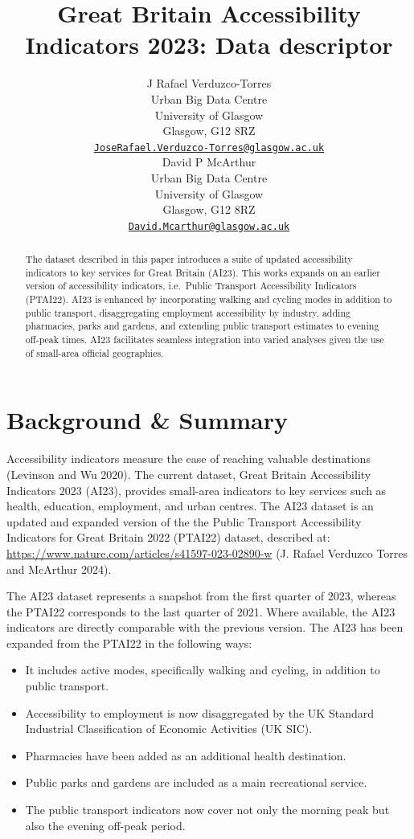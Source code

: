 \documentclass{article}
\title{Great Britain Accessibility Indicators 2023: Data descriptor}
\author{
    J Rafael Verduzco-Torres
   \\
    Urban Big Data Centre \\
    University of Glasgow \\
  Glasgow, G12 8RZ \\
  \texttt{\href{mailto:JoseRafael.Verduzco-Torres@glasgow.ac.uk}{\nolinkurl{JoseRafael.Verduzco-Torres@glasgow.ac.uk}}} \\
   \And
    David P McArthur
   \\
    Urban Big Data Centre \\
    University of Glasgow \\
  Glasgow, G12 8RZ \\
  \texttt{\href{mailto:David.Mcarthur@glasgow.ac.uk}{\nolinkurl{David.Mcarthur@glasgow.ac.uk}}} \\
  }
\providecommand{\tightlist}{%
  \setlength{\itemsep}{0pt}\setlength{\parskip}{0pt}}
\begin{document}
\maketitle


\begin{abstract}
The dataset described in this paper introduces a suite of updated
accessibility indicators to key services for Great Britain (AI23). This
works expands on an earlier version of accessibility indicators,
i.e.~Public Transport Accessibility Indicators (PTAI22). AI23 is
enhanced by incorporating walking and cycling modes in addition to
public transport, disaggregating employment accessibility by industry,
adding pharmacies, parks and gardens, and extending public transport
estimates to evening off-peak times. AI23 facilitates seamless
integration into varied analyses given the use of small-area official
geographies.
\end{abstract}


\hypertarget{background-summary}{%
\section{Background \& Summary}\label{background-summary}}

Accessibility indicators measure the ease of reaching valuable
destinations (Levinson and Wu 2020). The current dataset, Great Britain
Accessibility Indicators 2023 (AI23), provides small-area indicators to
key services such as health, education, employment, and urban centres.
The AI23 dataset is an updated and expanded version of the the Public
Transport Accessibility Indicators for Great Britain 2022 (PTAI22)
dataset, described at:
\url{https://www.nature.com/articles/s41597-023-02890-w} (J. Rafael
Verduzco Torres and McArthur 2024).

The AI23 dataset represents a snapshot from the first quarter of 2023,
whereas the PTAI22 corresponds to the last quarter of 2021. Where
available, the AI23 indicators are directly comparable with the previous
version. The AI23 has been expanded from the PTAI22 in the following
ways:

\begin{itemize}
\tightlist
\item
  It includes active modes, specifically walking and cycling, in
  addition to public transport.
\item
  Accessibility to employment is now disaggregated by the UK Standard
  Industrial Classification of Economic Activities (UK SIC).
\item
  Pharmacies have been added as an additional health destination.
\item
  Public parks and gardens are included as a main recreational service.
\item
  The public transport indicators now cover not only the morning peak
  but also the evening off-peak period.
\end{itemize}
\end{document}
